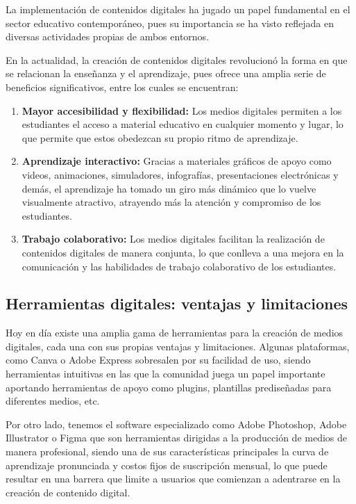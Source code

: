 \documentclass[12pt,a4paper]{report}
\begin{document}
La implementación de contenidos digitales ha jugado un papel fundamental en el sector educativo contemporáneo, pues su importancia se ha visto reflejada en diversas actividades propias de ambos entornos.

En la actualidad, la creación de contenidos digitales revolucionó la forma en que se relacionan la enseñanza y el aprendizaje, pues ofrece una amplia serie de beneficios significativos, entre los cuales se encuentran:

\begin{enumerate}
\item \textbf{Mayor accesibilidad y flexibilidad:} Los medios digitales permiten a los estudiantes el acceso a material educativo en cualquier momento y lugar, lo que permite que estos obedezcan su propio ritmo de aprendizaje.

\item \textbf{Aprendizaje interactivo:} Gracias a materiales gráficos de apoyo como videos, animaciones, simuladores, infografías, presentaciones electrónicas y demás, el aprendizaje ha tomado un giro más dinámico que lo vuelve visualmente atractivo, atrayendo más la atención y compromiso de los estudiantes.

\item \textbf{Trabajo colaborativo:} Los medios digitales facilitan la realización de contenidos digitales de manera conjunta, lo que conlleva a una mejora en la comunicación y las habilidades de trabajo colaborativo de los estudiantes.
\end{enumerate}

\subsection{Herramientas digitales: ventajas y limitaciones}

Hoy en día existe una amplia gama de herramientas para la creación de medios digitales, cada una con sus propias ventajas y limitaciones. Algunas plataformas, como Canva o Adobe Express sobresalen por su facilidad de uso, siendo herramientas intuitivas en las que la comunidad juega un papel importante aportando herramientas de apoyo como plugins, plantillas prediseñadas para diferentes medios, etc.

Por otro lado, tenemos el software especializado como Adobe Photoshop, Adobe Illustrator o Figma que son herramientas dirigidas a la producción de medios de manera profesional, siendo una de sus características principales la curva de aprendizaje pronunciada y costos fijos de suscripción mensual, lo que puede resultar en una barrera que limite a usuarios que comienzan a adentrarse en la creación de contenido digital.
\end{document}
